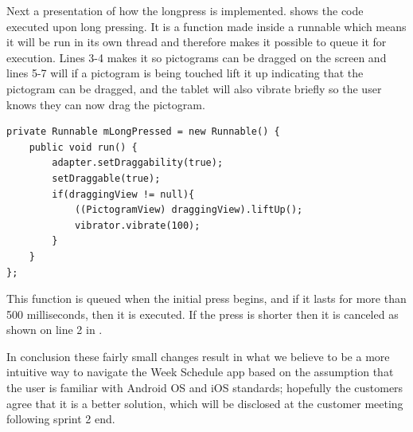 Next a presentation of how the longpress is implemented.
 shows the code executed upon long pressing.
It is a function made inside a runnable which means it will be run in its own thread and therefore makes it possible to queue it for execution.
Lines 3-4 makes it so pictograms can be dragged on the screen and lines 5-7 will if a pictogram is being touched lift it up indicating that the pictogram can be dragged, and the tablet will also vibrate briefly so the user knows they can now drag the pictogram.

\begin{lstlisting}[floatplacement=h, caption={The longpress function which is queued upon a \texttt{MotionEvent\_Down}, i.e. a touch.}, label={lst:longpress}] 
private Runnable mLongPressed = new Runnable() {
    public void run() {
        adapter.setDraggability(true);
        setDraggable(true);
        if(draggingView != null){
            ((PictogramView) draggingView).liftUp();
            vibrator.vibrate(100);
        }
    }
};
\end{lstlisting}
This function is queued when the initial press begins, and if it lasts for more than 500 milliseconds, then it is executed. 
If the press is shorter then it is canceled as shown on line 2 in . 

\bigskip \noindent
In conclusion these fairly small changes result in what we believe to be a more intuitive way to navigate the Week Schedule app based on the assumption that the user is familiar with Android OS and iOS standards; hopefully the customers agree that it is a better solution, which will be disclosed at the customer meeting following sprint 2 end.